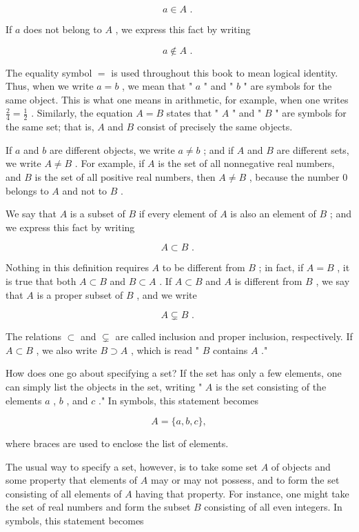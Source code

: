 \[
a \in  A\text{ . }
\]

If \(a\) does not belong to \(A\) , we express this fact by writing

\[
a \notin  A\text{ . }
\]

The equality symbol \(=\) is used throughout this book to mean logical identity. Thus, when we write \(a = b\) , we mean that " \(a\) " and " \(b\) " are symbols for the same object. This is what one means in arithmetic, for example, when one writes \(\frac{2}{4} = \frac{1}{2}\) . Similarly, the equation \(A = B\) states that " \(A\) " and " \(B\) " are symbols for the same set; that is, \(A\) and \(B\) consist of precisely the same objects.

If \(a\) and \(b\) are different objects, we write \(a \neq  b\) ; and if \(A\) and \(B\) are different sets, we write \(A \neq  B\) . For example, if \(A\) is the set of all nonnegative real numbers, and \(B\) is the set of all positive real numbers, then \(A \neq  B\) , because the number 0 belongs to \(A\) and not to \(B\) .

We say that \(A\) is a subset of \(B\) if every element of \(A\) is also an element of \(B\) ; and we express this fact by writing

\[
A \subset  B\text{ . }
\]

Nothing in this definition requires \(A\) to be different from \(B\) ; in fact, if \(A = B\) , it is true that both \(A \subset  B\) and \(B \subset  A\) . If \(A \subset  B\) and \(A\) is different from \(B\) , we say that \(A\) is a proper subset of \(B\) , and we write

\[
A \varsubsetneq  B\text{ . }
\]

The relations \(\subset\) and \(\varsubsetneq\) are called inclusion and proper inclusion, respectively. If \(A \subset  B\) , we also write \(B \supset  A\) , which is read " \(B\) contains \(A\) ."

How does one go about specifying a set? If the set has only a few elements, one can simply list the objects in the set, writing " \(A\) is the set consisting of the elements \(a\) , \(b\) , and \(c\) ." In symbols, this statement becomes

\[
A = \{ a,b,c\} ,
\]

where braces are used to enclose the list of elements.

The usual way to specify a set, however, is to take some set \(A\) of objects and some property that elements of \(A\) may or may not possess, and to form the set consisting of all elements of \(A\) having that property. For instance, one might take the set of real numbers and form the subset \(B\) consisting of all even integers. In symbols, this statement becomes

